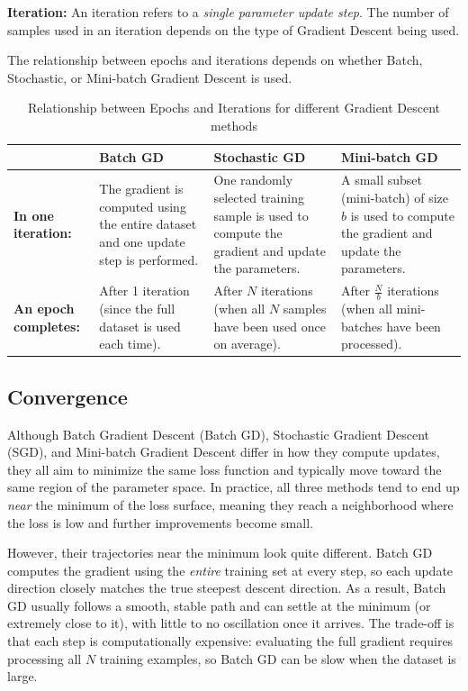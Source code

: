 \documentclass{article}
\begin{document}
\textbf{Iteration:}  
An iteration refers to a \textit{single parameter update step}. The number of samples used in an iteration depends on the type of Gradient Descent being used.

The relationship between epochs and iterations depends on whether Batch, Stochastic, or Mini-batch Gradient Descent is used.

\begin{table}[H]
    \centering
    \renewcommand{\arraystretch}{2}
    \begin{tabular}{|>{\centering\arraybackslash}m{2.7cm}|>{\centering\arraybackslash}m{4cm}|>{\centering\arraybackslash}m{4cm}|>{\centering\arraybackslash}m{4cm}|}
        \hline
        & \textbf{Batch GD} & \textbf{Stochastic GD} & \textbf{Mini-batch GD} \\
        \hline
        \textbf{In one iteration:} &
        The gradient is computed using the entire dataset and one update step is performed. &
        One randomly selected training sample is used to compute the gradient and update the parameters. &
        A small subset (mini-batch) of size \( b \) is used to compute the gradient and update the parameters. \\
        \hline
        \textbf{An epoch completes:} &
        After 1 iteration (since the full dataset is used each time). &
        After \( N \) iterations (when all \( N \) samples have been used once on average). &
        After \( \frac{N}{b} \) iterations (when all mini-batches have been processed). \\
        \hline
    \end{tabular}
    \caption{Relationship between Epochs and Iterations for different Gradient Descent methods}
\end{table}

\subsection{Convergence}

Although Batch Gradient Descent (Batch GD), Stochastic Gradient Descent (SGD), and Mini-batch Gradient Descent differ in how they compute updates, they all aim to minimize the same loss function and typically move toward the same region of the parameter space. In practice, all three methods tend to end up \emph{near} the minimum of the loss surface, meaning they reach a neighborhood where the loss is low and further improvements become small.

However, their trajectories near the minimum look quite different. Batch GD computes the gradient using the \emph{entire} training set at every step, so each update direction closely matches the true steepest descent direction. As a result, Batch GD usually follows a smooth, stable path and can settle at the minimum (or extremely close to it), with little to no oscillation once it arrives. The trade-off is that each step is computationally expensive: evaluating the full gradient requires processing all $N$ training examples, so Batch GD can be slow when the dataset is large.
\end{document}
